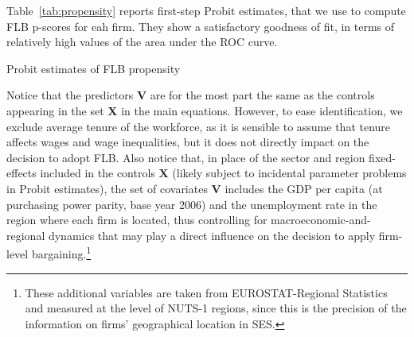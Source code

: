 \documentclass[12pt]{article}
\begin{document}
Table~\ref{tab:propensity} reports first-step Probit estimates, that
we use to compute FLB p-scores for eah firm. They show a satisfactory
goodness of fit, in terms of relatively high values of the area under
the ROC curve.

\begin{table}[thb]
\caption{Probit estimates of FLB propensity}
\label{tab:propensity}

\end{table}

Notice that the predictors $\bm{V}$ are for the most part the same as
the controls appearing in the set $\bm{X}$ in the main equations.
However, to ease identification, we exclude average tenure of the
workforce, as it is sensible to assume that tenure affects wages and
wage inequalities, but it does not directly impact on the decision to
adopt FLB. Also notice that, in place of the sector and region
fixed-effects included in the controls $\bm{X}$ (likely subject to
incidental parameter problems in Probit estimates), the set of
covariates $\bm{V}$ includes the GDP per capita (at
purchasing power parity, base year 2006) and the unemployment rate in
the region where each firm is located, thus controlling for
macroeconomic-and-regional dynamics that may play a direct influence
on the decision to apply firm-level bargaining.\footnote{These
  additional variables are taken from EUROSTAT-Regional Statistics and
  measured at the level of NUTS-1 regions, since this is the
  precision of the information on firms' geographical location in
  SES.}
\end{document}

